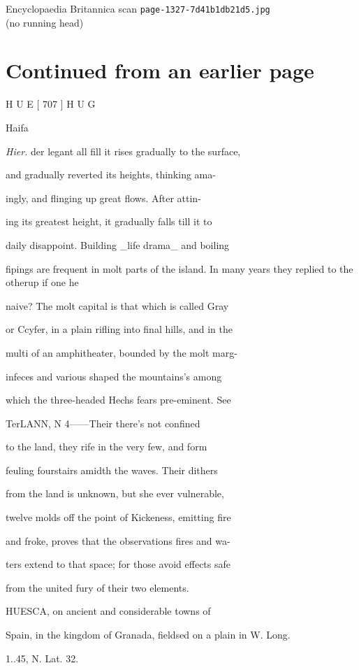 \documentclass{article}
\begin{document}
\begin{center}
{\Large Encyclopaedia Britannica scan \texttt{page-1327-7d41b1db21d5.jpg}}\\[0.5em]
(no running head)
\end{center}
\section*{Continued from an earlier page}
H U E [ 707 ] H U G

Haifa

\textit{Hier.}
der legant all fill it rises gradually to the surface,

and gradually reverted its heights, thinking ama-

ingly, and flinging up great flows. After attin-

ing its greatest height, it gradually falls till it to

daily disappoint. Building \_life drama\_ and boiling

fipings are frequent in molt parts of the island. In many years they replied to the otherup if one he

naive? The molt capital is that which is called Gray

or Ccyfer, in a plain rifling into final hills, and in the

multi of an amphitheater, bounded by the molt marg-

infeces and various shaped the mountains’s among

which the three-headed Hechs fears pre-eminent. See

TerLANN, N 4——Their there's not confined

to the land, they rife in the very few, and form

feuling fourstairs amidth the waves. Their dithers

from the land is unknown, but she ever vulnerable,

twelve molds off the point of Kickeness, emitting fire

and froke, proves that the observations fires and wa-

ters extend to that space; for those avoid effects safe

from the united fury of their two elements.

HUESCA, on ancient and considerable towns of

Spain, in the kingdom of Granada, fieldsed on a plain in W. Long.

1..45, N. Lat. 32.
\end{document}
